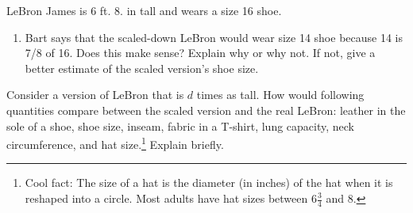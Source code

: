 \begin{prob}
LeBron James is 6 ft. 8. in tall and wears a size 16 shoe.  
\begin{enumerate}
Bart says a 5 ft. 10 in. version of LeBron would have a foot 7/8 as long.  Does this make sense?  Explain why or why not.  If not, give a better estimate.  
\item Bart says that the scaled-down LeBron would wear size 14 shoe because 14 is 7/8 of 16.  Does this make sense?  Explain why or why not.  If not, give a better estimate of the scaled version's shoe size.  
\end{enumerate}
\end{prob}

\begin{prob}
Consider a version of LeBron that is $d$ times as tall.  How would following quantities compare between the scaled version and the real LeBron:   leather in the sole of a shoe, shoe size, inseam, fabric in a T-shirt, lung capacity, neck circumference, and hat size.\footnote{Cool fact:  The size of a hat is the diameter (in inches) of the hat when it is reshaped into a circle.  Most adults have hat sizes between $6\frac{3}{4}$ and $8$.}  Explain briefly.  
\end{prob}


